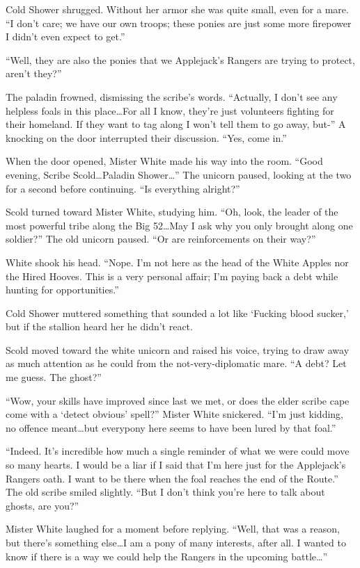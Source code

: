 Cold Shower shrugged. Without her armor she was quite small, even for a mare. ``I don't care; we have our own troops; these ponies are just some more firepower I didn't even expect to get.''

``Well, they are also the ponies that we Applejack's Rangers are trying to protect, aren't they?''

The paladin frowned, dismissing the scribe's words. ``Actually, I don't see any helpless foals in this place\dots For all I know, they're just volunteers fighting for their homeland. If they want to tag along I won't tell them to go away, but-'' A knocking on the door interrupted their discussion. ``Yes, come in.''

When the door opened, Mister White made his way into the room. ``Good evening, Scribe Scold\dots Paladin Shower\dots'' The unicorn paused, looking at the two for a second before continuing. ``Is everything alright?''

Scold turned toward Mister White, studying him. ``Oh, look, the leader of the most powerful tribe along the Big 52\dots May I ask why you only brought along one soldier?'' The old unicorn paused. ``Or are reinforcements on their way?''

White shook his head. ``Nope. I'm not here as the head of the White Apples nor the Hired Hooves. This is a very personal affair; I'm paying back a debt while hunting for opportunities.''

Cold Shower muttered something that sounded a lot like `Fucking blood sucker,' but if the stallion heard her he didn't react.

Scold moved toward the white unicorn and raised his voice, trying to draw away as much attention as he could from the not-very-diplomatic mare. ``A debt? Let me guess. The ghost?''

``Wow, your skills have improved since last we met, or does the elder scribe cape come with a `detect obvious' spell?'' Mister White snickered. ``I'm just kidding, no offence meant\dots but everypony here seems to have been lured by that foal.''

``Indeed. It's incredible how much a single reminder of what we were could move so many hearts. I would be a liar if I said that I'm here just for the Applejack's Rangers oath. I want to be there when the foal reaches the end of the Route.'' The old scribe smiled slightly. ``But I don't think you're here to talk about ghosts, are you?''

Mister White laughed for a moment before replying. ``Well, that was a reason, but there's something else\dots I am a pony of many interests, after all. I wanted to know if there is a way we could help the Rangers in the upcoming battle\dots''

